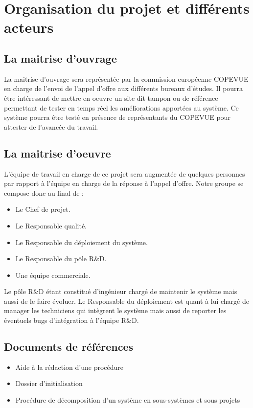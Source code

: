 \section{Organisation du projet et différents acteurs}
\subsection{La maitrise d'ouvrage}
La maitrise d'ouvrage sera représentée par la commission européenne COPEVUE en charge de l'envoi de l'appel d'offre aux différents bureaux d'études. Il pourra être intéressant de mettre en oeuvre un site dit tampon ou de référence permettant de tester en temps réel les améliorations apportées au système. Ce système pourra être testé en présence de représentants du COPEVUE pour attester de l'avancée du travail.
\subsection{La maitrise d'oeuvre}
L'équipe de travail en charge de ce projet sera augmentée de quelques personnes par rapport à l'équipe en charge de la réponse à l'appel d'offre.
Notre groupe se compose donc au final de :

\begin{itemize}
\item Le Chef de projet.
\item Le Responsable qualité.
\item Le Responsable du déploiement du système.
\item Le Responsable du pôle R\&D.
\item Une équipe commerciale.
\end{itemize}
Le pôle R\&D étant constitué d'ingénieur chargé de maintenir le système mais aussi de le faire évoluer.
Le Responsable du déploiement est quant à lui chargé de manager les techniciens qui intègrent le système mais aussi de reporter les éventuels bugs d'intégration à l'équipe R\&D.

\subsection{Documents de références}
\begin{itemize}
\item Aide à la rédaction d'une procédure
\item Dossier d'initialisation
\item Procédure de décomposition d'un système en sous-systèmes et sous projets
\end{itemize}

